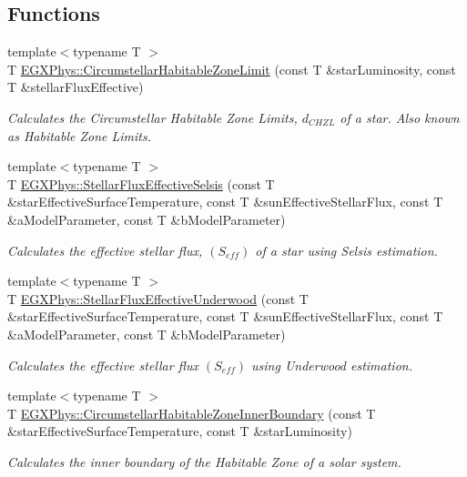 \subsection*{Functions}
\begin{DoxyCompactItemize}
\item 
{\footnotesize template$<$typename T $>$ }\\T \mbox{\hyperlink{group___astrophysics_ga23a8f602461ea3257e8767b1d455c383}{E\+G\+X\+Phys\+::\+Circumstellar\+Habitable\+Zone\+Limit}} (const T \&star\+Luminosity, const T \&stellar\+Flux\+Effective)
\begin{DoxyCompactList}\small\item\em Calculates the Circumstellar Habitable Zone Limits, $d_{CHZL}$ of a star. Also known as Habitable Zone Limits. \end{DoxyCompactList}\item 
{\footnotesize template$<$typename T $>$ }\\T \mbox{\hyperlink{group___astrophysics_ga3ce3a04fec7b1c8fb66ac54270ce3902}{E\+G\+X\+Phys\+::\+Stellar\+Flux\+Effective\+Selsis}} (const T \&star\+Effective\+Surface\+Temperature, const T \&sun\+Effective\+Stellar\+Flux, const T \&a\+Model\+Parameter, const T \&b\+Model\+Parameter)
\begin{DoxyCompactList}\small\item\em Calculates the effective stellar flux, $(S_{eff})$ of a star using Selsis estimation. \end{DoxyCompactList}\item 
{\footnotesize template$<$typename T $>$ }\\T \mbox{\hyperlink{group___astrophysics_ga34d1e39bce17904bc6d383f1935c79d6}{E\+G\+X\+Phys\+::\+Stellar\+Flux\+Effective\+Underwood}} (const T \&star\+Effective\+Surface\+Temperature, const T \&sun\+Effective\+Stellar\+Flux, const T \&a\+Model\+Parameter, const T \&b\+Model\+Parameter)
\begin{DoxyCompactList}\small\item\em Calculates the effective stellar flux $(S_{eff})$ using Underwood estimation. \end{DoxyCompactList}\item 
{\footnotesize template$<$typename T $>$ }\\T \mbox{\hyperlink{group___astrophysics_ga9ee2e8023cb444aa4638c962788b5853}{E\+G\+X\+Phys\+::\+Circumstellar\+Habitable\+Zone\+Inner\+Boundary}} (const T \&star\+Effective\+Surface\+Temperature, const T \&star\+Luminosity)
\begin{DoxyCompactList}\small\item\em Calculates the inner boundary of the Habitable Zone of a solar system. \end{DoxyCompactList}\item 

\end{DoxyCompactItemize}
